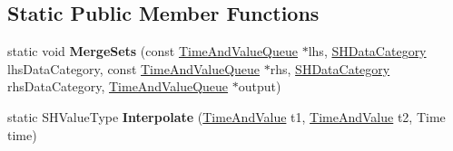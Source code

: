 \subsection*{Static Public Member Functions}
\begin{DoxyCompactItemize}
\item 
\hypertarget{struct_rak_net_1_1_statistics_history_1_1_time_and_value_queue_ac16004822d60ab5cd6b6a082d592e0b5}{static void {\bfseries Merge\-Sets} (const \hyperlink{struct_rak_net_1_1_statistics_history_1_1_time_and_value_queue}{Time\-And\-Value\-Queue} $\ast$lhs, \hyperlink{class_rak_net_1_1_statistics_history_a197b0da149b5168c77891e3f9d289a0b}{S\-H\-Data\-Category} lhs\-Data\-Category, const \hyperlink{struct_rak_net_1_1_statistics_history_1_1_time_and_value_queue}{Time\-And\-Value\-Queue} $\ast$rhs, \hyperlink{class_rak_net_1_1_statistics_history_a197b0da149b5168c77891e3f9d289a0b}{S\-H\-Data\-Category} rhs\-Data\-Category, \hyperlink{struct_rak_net_1_1_statistics_history_1_1_time_and_value_queue}{Time\-And\-Value\-Queue} $\ast$output)}\label{struct_rak_net_1_1_statistics_history_1_1_time_and_value_queue_ac16004822d60ab5cd6b6a082d592e0b5}

\item 
\hypertarget{struct_rak_net_1_1_statistics_history_1_1_time_and_value_queue_ae3a2d728950f1946556d2ba410c8e618}{static S\-H\-Value\-Type {\bfseries Interpolate} (\hyperlink{struct_rak_net_1_1_statistics_history_1_1_time_and_value}{Time\-And\-Value} t1, \hyperlink{struct_rak_net_1_1_statistics_history_1_1_time_and_value}{Time\-And\-Value} t2, Time time)}\label{struct_rak_net_1_1_statistics_history_1_1_time_and_value_queue_ae3a2d728950f1946556d2ba410c8e618}

\end{DoxyCompactItemize}
